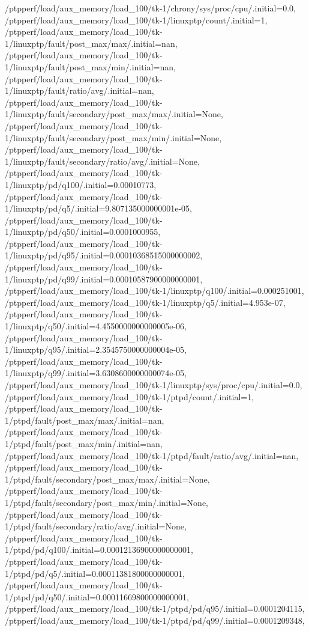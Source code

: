 {    /ptpperf/load/aux_memory/load_100/tk-1/chrony/sys/proc/cpu/.initial=0.0,
    /ptpperf/load/aux_memory/load_100/tk-1/linuxptp/count/.initial=1,
    /ptpperf/load/aux_memory/load_100/tk-1/linuxptp/fault/post_max/max/.initial=nan,
    /ptpperf/load/aux_memory/load_100/tk-1/linuxptp/fault/post_max/min/.initial=nan,
    /ptpperf/load/aux_memory/load_100/tk-1/linuxptp/fault/ratio/avg/.initial=nan,
    /ptpperf/load/aux_memory/load_100/tk-1/linuxptp/fault/secondary/post_max/max/.initial=None,
    /ptpperf/load/aux_memory/load_100/tk-1/linuxptp/fault/secondary/post_max/min/.initial=None,
    /ptpperf/load/aux_memory/load_100/tk-1/linuxptp/fault/secondary/ratio/avg/.initial=None,
    /ptpperf/load/aux_memory/load_100/tk-1/linuxptp/pd/q100/.initial=0.00010773,
    /ptpperf/load/aux_memory/load_100/tk-1/linuxptp/pd/q5/.initial=9.807135000000001e-05,
    /ptpperf/load/aux_memory/load_100/tk-1/linuxptp/pd/q50/.initial=0.0001000955,
    /ptpperf/load/aux_memory/load_100/tk-1/linuxptp/pd/q95/.initial=0.00010368515000000002,
    /ptpperf/load/aux_memory/load_100/tk-1/linuxptp/pd/q99/.initial=0.00010587900000000001,
    /ptpperf/load/aux_memory/load_100/tk-1/linuxptp/q100/.initial=0.000251001,
    /ptpperf/load/aux_memory/load_100/tk-1/linuxptp/q5/.initial=4.953e-07,
    /ptpperf/load/aux_memory/load_100/tk-1/linuxptp/q50/.initial=4.4550000000000005e-06,
    /ptpperf/load/aux_memory/load_100/tk-1/linuxptp/q95/.initial=2.3545750000000004e-05,
    /ptpperf/load/aux_memory/load_100/tk-1/linuxptp/q99/.initial=3.6308600000000074e-05,
    /ptpperf/load/aux_memory/load_100/tk-1/linuxptp/sys/proc/cpu/.initial=0.0,
    /ptpperf/load/aux_memory/load_100/tk-1/ptpd/count/.initial=1,
    /ptpperf/load/aux_memory/load_100/tk-1/ptpd/fault/post_max/max/.initial=nan,
    /ptpperf/load/aux_memory/load_100/tk-1/ptpd/fault/post_max/min/.initial=nan,
    /ptpperf/load/aux_memory/load_100/tk-1/ptpd/fault/ratio/avg/.initial=nan,
    /ptpperf/load/aux_memory/load_100/tk-1/ptpd/fault/secondary/post_max/max/.initial=None,
    /ptpperf/load/aux_memory/load_100/tk-1/ptpd/fault/secondary/post_max/min/.initial=None,
    /ptpperf/load/aux_memory/load_100/tk-1/ptpd/fault/secondary/ratio/avg/.initial=None,
    /ptpperf/load/aux_memory/load_100/tk-1/ptpd/pd/q100/.initial=0.00012136900000000001,
    /ptpperf/load/aux_memory/load_100/tk-1/ptpd/pd/q5/.initial=0.00011381800000000001,
    /ptpperf/load/aux_memory/load_100/tk-1/ptpd/pd/q50/.initial=0.00011669800000000001,
    /ptpperf/load/aux_memory/load_100/tk-1/ptpd/pd/q95/.initial=0.0001204115,
    /ptpperf/load/aux_memory/load_100/tk-1/ptpd/pd/q99/.initial=0.0001209348,
}
